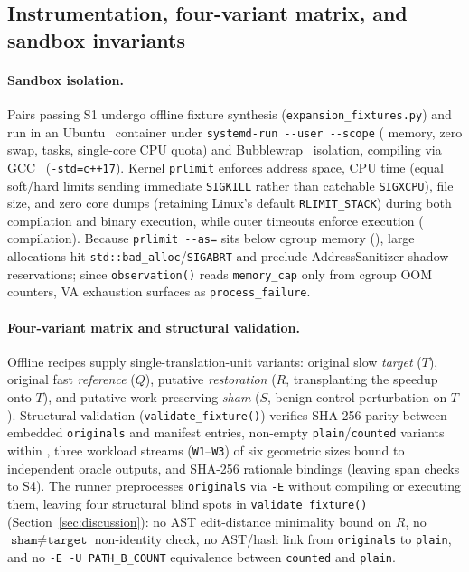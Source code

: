 \documentclass[11pt]{article}
\begin{document}
\subsection{Instrumentation, four-variant matrix, and sandbox invariants}

\paragraph{Sandbox isolation.}
Pairs passing S1 undergo offline fixture synthesis (\texttt{expansion\_fixtures.py}) and run in an Ubuntu~\BenchUbuntuVer{} container under \texttt{systemd-run -{}-user -{}-scope} (\BenchMemCapMiB{} memory, zero swap, \BenchTasksCap{} tasks, single-core CPU quota) and Bubblewrap~\BenchBwrapVer{} isolation, compiling via GCC~\BenchGCC{} (\texttt{-std=c++17}).
Kernel \texttt{prlimit} enforces \BenchAsCapMiB{} address space, \BenchCpuCapSec{} CPU time (equal soft/hard limits sending immediate \texttt{SIGKILL} rather than catchable \texttt{SIGXCPU}), \BenchFileCapMB{} file size, and zero core dumps (retaining Linux's default \BenchStackCapMB{} \texttt{RLIMIT\_STACK}) during both compilation and binary execution, while outer timeouts enforce \BenchWallCapSec{} execution (\BenchCompileTimeoutSec{} compilation).
Because \texttt{prlimit -{}-as=\BenchAsCapMiB{}} sits below cgroup memory (\BenchMemCapMiB{}), large allocations hit \texttt{std::bad\_alloc}/\texttt{SIGABRT} and preclude AddressSanitizer shadow reservations; since \texttt{observation()} reads \texttt{memory\_cap} only from cgroup OOM counters, VA exhaustion surfaces as \texttt{process\_failure}.

\paragraph{Four-variant matrix and structural validation.}
Offline recipes supply \BenchNumVariants{} single-translation-unit variants: original slow \emph{target} ($T$), original fast \emph{reference} ($Q$), putative \emph{restoration} ($R$, transplanting the speedup onto $T$), and putative work-preserving \emph{sham} ($S$, benign control perturbation on $T$).
Structural validation (\texttt{validate\_fixture()}) verifies SHA-256 parity between embedded \texttt{originals} and manifest entries, non-empty \texttt{plain}/\texttt{counted} variants within \BenchFileCapMB{}, three workload streams (\texttt{W1}--\texttt{W3}) of six geometric sizes bound to independent oracle outputs, and SHA-256 rationale bindings (leaving span checks to S4).
The runner preprocesses \texttt{originals} via \texttt{-E} without compiling or executing them, leaving four structural blind spots in \texttt{validate\_fixture()} (Section~\ref{sec:discussion}): no AST edit-distance minimality bound on $R$, no $\texttt{sham} \neq \texttt{target}$ non-identity check, no AST/hash link from \texttt{originals} to \texttt{plain}, and no \texttt{-E -U PATH\_B\_COUNT} equivalence between \texttt{counted} and \texttt{plain}.
\end{document}
